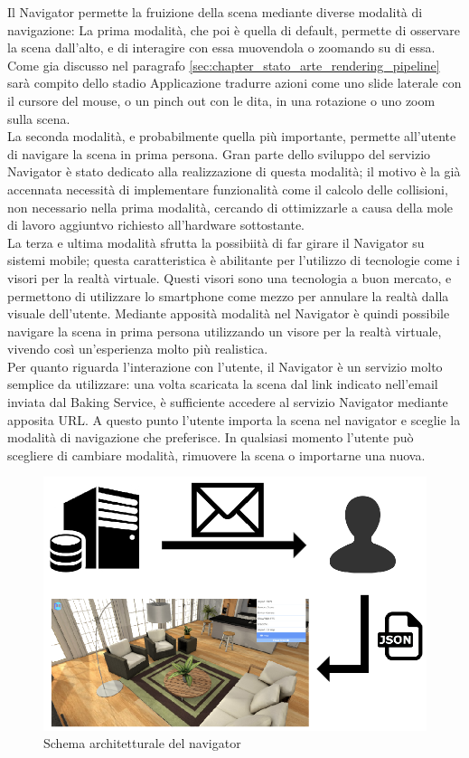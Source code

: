 Il Navigator permette la fruizione della scena mediante diverse modalità di navigazione:
La prima modalità, che poi è quella di default, permette di osservare la scena dall’alto, e di interagire con essa muovendola o zoomando su di essa. Come gia discusso nel paragrafo \ref{sec:chapter_stato_arte_rendering_pipeline}  sarà compito dello stadio Applicazione tradurre azioni come uno slide laterale con il cursore del mouse, o un pinch out con le dita, in una rotazione o uno zoom sulla scena.
\\
La seconda modalità, e probabilmente quella più importante, permette all’utente di navigare la scena in prima persona. Gran parte dello sviluppo del servizio Navigator è stato dedicato alla realizzazione di questa modalità; il motivo è la già accennata necessità di implementare funzionalità come il calcolo delle collisioni, non necessario nella prima modalità, cercando di ottimizzarle a causa della mole di lavoro aggiuntvo richiesto all’hardware sottostante.
\\
La terza e ultima modalità sfrutta la possibiità di far girare il Navigator su sistemi mobile; questa caratteristica è abilitante per l’utilizzo di tecnologie come i visori per la realtà virtuale. Questi visori sono una tecnologia a buon mercato, e permettono di utilizzare lo smartphone come mezzo per annulare la realtà dalla visuale dell’utente. Mediante apposità modalità nel Navigator è quindi possibile navigare la scena in prima persona utilizzando un visore per la realtà virtuale, vivendo così un’esperienza molto più realistica. 
\\
Per quanto riguarda l’interazione con l’utente, il Navigator è un servizio molto semplice da utilizzare: una volta scaricata la scena dal link indicato nell’email inviata dal Baking Service, è sufficiente accedere al servizio Navigator mediante apposita URL. A questo punto l’utente importa la scena nel navigator e sceglie la modalità di navigazione che preferisce. In qualsiasi momento l’utente può scegliere di cambiare modalità, rimuovere la scena o importarne una nuova.
\\
\begin{figure}[htb]
 \centering
 \includegraphics[width=0.8\linewidth]{images/chapter_architettura_sistema/as_navigator.png}\hfill
 \caption[Schema architetturale navigator]{Schema architetturale del navigator}
 \label{fig:as_navigator}
\end{figure}

